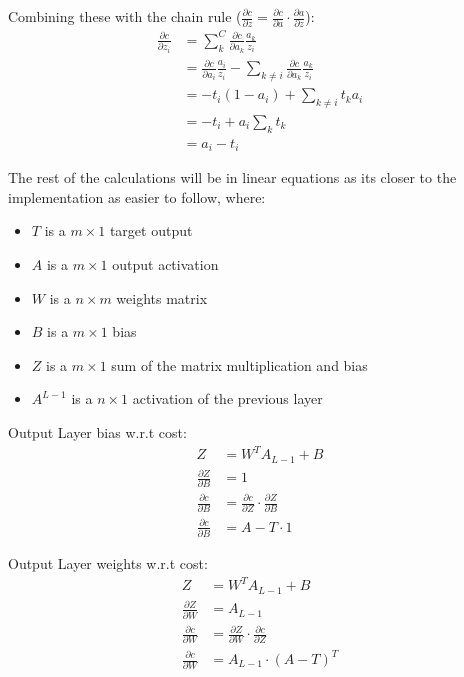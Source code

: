 Combining these with the chain rule (\(\frac{\partial c}{\partial z} = \frac{\partial c}{\partial a} \cdot \frac{\partial a}{\partial z}\)):
\begin{equation}
    \begin{aligned}
        \frac{\partial c}{\partial z_{i}} &= \sum_{k}^{C} \frac{\partial c}{\partial a_{k}} \frac{a_{k}}{z_{i}}\\
        &= \frac{\partial c}{\partial a_{i}} \frac{a_{i}}{z_{i}} - \sum_{k \neq i} \frac{\partial c}{\partial a_{k}} \frac{a_{k}}{z_{i}}\\
        &= - t_{i}(1 - a_{i}) + \sum_{k \neq i} t_{k}a_{i}\\
        &= - t_{i} + a_{i} \sum_{k} t_{k}\\
        &= a_{i} - t_{i}
    \end{aligned}
\end{equation}

The rest of the calculations will be in linear equations as its closer to the
implementation as easier to follow, where:
\begin{itemize}
    \item \( T \) is a \( m \times 1 \) target output
    \item \( A \) is a  \( m \times 1 \) output activation
    \item \( W \) is a \( n \times m \) weights matrix
    \item \( B \) is a \( m \times 1 \) bias
    \item \( Z \) is a \( m \times 1 \) sum of the matrix multiplication and bias
    \item \(A^{L-1} \) is a \( n \times 1 \) activation of the previous layer
\end{itemize}

Output Layer bias w.r.t cost:
\begin{equation}
    \begin{aligned}
        Z &= W^{T}A_{L-1} + B\\
        \frac{\partial Z}{\partial B} &= 1\\[2em]
        \frac{\partial c}{\partial B} &= \frac{\partial c}{\partial Z} \cdot \frac{\partial Z}{\partial B}\\
        \frac{\partial c}{\partial B} &= A - T \cdot 1
    \end{aligned}
\end{equation}

Output Layer weights w.r.t cost:
\begin{equation}
    \begin{aligned}
        Z &= W^{T}A_{L-1} + B\\
        \frac{\partial Z}{\partial W} &= A_{L-1}\\[2em]
        \frac{\partial c}{\partial W} &= \frac{\partial Z}{\partial W} \cdot \frac{\partial c}{\partial Z} \\
        \frac{\partial c}{\partial W} &= A_{L-1} \cdot (A - T)^{T}
    \end{aligned}
\end{equation}

